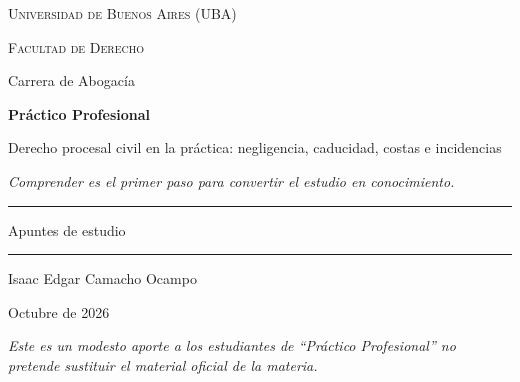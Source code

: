 \documentclass[12pt,oneside]{book}
\newcommand{\universidad}{Universidad de Buenos Aires (UBA)}
\newcommand{\facultad}{Facultad de Derecho}
\newcommand{\carrera}{Carrera de Abogacía}
\newcommand{\materia}{Práctico Profesional}
\newcommand{\titulo}{Derecho procesal civil en la práctica: negligencia, caducidad, costas e incidencias}
\newcommand{\autor}{Isaac Edgar Camacho Ocampo}
\newcommand{\anio}{Octubre de 2026}
\begin{document}
\begin{titlepage}

\thispagestyle{empty}

\begin{center}

\vspace*{1cm}

{\large \textsc{\universidad}}

\vspace{0.2cm}

{\large \textsc{\facultad}}

\vspace{0.2cm}

{\large \carrera}

\vspace{3cm}

{\Huge \textbf{\materia}}

\vspace{1cm}

{\LARGE \titulo}

\vspace{0.8cm}

\textit{Comprender es el primer paso para convertir el estudio en conocimiento.}

\vspace{1.2cm}

\rule{0.70\textwidth}{0.5pt}

\vspace{0.5cm}

{\large Apuntes de estudio}

\vspace{0.5cm}

\rule{0.70\textwidth}{0.5pt}

\vfill

{\large \autor}

\vspace{0.3cm}

{\large \anio}

\end{center}

\vfill

\begin{flushleft}
\textit{Este es un modesto aporte a los estudiantes de ``Práctico Profesional'' no pretende sustituir el material oficial de la materia.}
\end{flushleft}

\end{titlepage}
\end{document}
